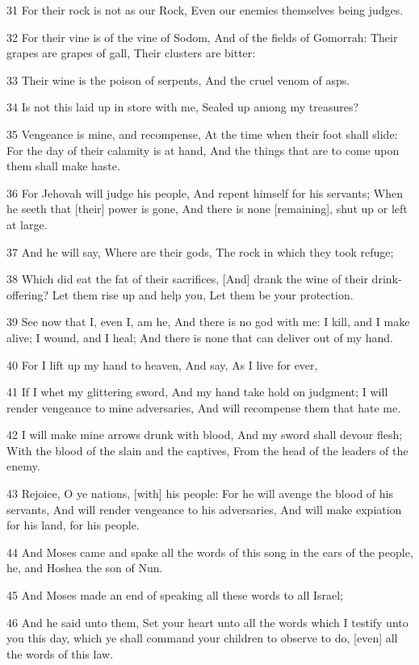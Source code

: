 \par 31 For their rock is not as our Rock, Even our enemies themselves being judges.
\par 32 For their vine is of the vine of Sodom, And of the fields of Gomorrah: Their grapes are grapes of gall, Their clusters are bitter:
\par 33 Their wine is the poison of serpents, And the cruel venom of asps.
\par 34 Is not this laid up in store with me, Sealed up among my treasures?
\par 35 Vengeance is mine, and recompense, At the time when their foot shall slide: For the day of their calamity is at hand, And the things that are to come upon them shall make haste.
\par 36 For Jehovah will judge his people, And repent himself for his servants; When he seeth that [their] power is gone, And there is none [remaining], shut up or left at large.
\par 37 And he will say, Where are their gods, The rock in which they took refuge;
\par 38 Which did eat the fat of their sacrifices, [And] drank the wine of their drink-offering? Let them rise up and help you, Let them be your protection.
\par 39 See now that I, even I, am he, And there is no god with me: I kill, and I make alive; I wound, and I heal; And there is none that can deliver out of my hand.
\par 40 For I lift up my hand to heaven, And say, As I live for ever,
\par 41 If I whet my glittering sword, And my hand take hold on judgment; I will render vengeance to mine adversaries, And will recompense them that hate me.
\par 42 I will make mine arrows drunk with blood, And my sword shall devour flesh; With the blood of the slain and the captives, From the head of the leaders of the enemy.
\par 43 Rejoice, O ye nations, [with] his people: For he will avenge the blood of his servants, And will render vengeance to his adversaries, And will make expiation for his land, for his people.
\par 44 And Moses came and spake all the words of this song in the ears of the people, he, and Hoshea the son of Nun.
\par 45 And Moses made an end of speaking all these words to all Israel;
\par 46 And he said unto them, Set your heart unto all the words which I testify unto you this day, which ye shall command your children to observe to do, [even] all the words of this law.
